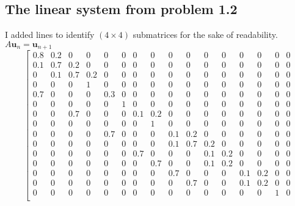 \documentclass[letterpaper, 10pt]{article}
\begin{document}
\subsection{The linear system from problem 1.2}
I added lines to identify $(4 \times 4)$ submatrices for the sake of readability. $A \mathbf{u}_n = \mathbf{u}_{n+1}$
\[
\left[
\begin{array}{cccc|cccc|cccc|cccc}
0.8 & 0.2  & 0   & 0   & 0   & 0   & 0   & 0   & 0   & 0   & 0   & 0   & 0   & 0   & 0   & 0   \\ %
0.1 & 0.7  & 0.2 & 0   & 0   & 0   & 0   & 0   & 0   & 0   & 0   & 0   & 0   & 0   & 0   & 0   \\ %
0   & 0.1  & 0.7 & 0.2 & 0   & 0   & 0   & 0   & 0   & 0   & 0   & 0   & 0   & 0   & 0   & 0   \\ %
0   & 0    & 0   & 1   & 0   & 0   & 0   & 0   & 0   & 0   & 0   & 0   & 0   & 0   & 0   & 0   \\ %
\hline
0.7 & 0    & 0   & 0   & 0.3 & 0   & 0   & 0   & 0   & 0   & 0   & 0   & 0   & 0   & 0   & 0   \\ %
0   & 0    & 0   & 0   & 0   & 1   & 0   & 0   & 0   & 0   & 0   & 0   & 0   & 0   & 0   & 0   \\ %
0   & 0    & 0.7 & 0   & 0   & 0   & 0.1 & 0.2 & 0   & 0   & 0   & 0   & 0   & 0   & 0   & 0   \\ %
0   & 0    & 0   & 0   & 0   & 0   & 0   & 1   & 0   & 0   & 0   & 0   & 0   & 0   & 0   & 0   \\ %
\hline
0   & 0    & 0   & 0   & 0.7 & 0   & 0   & 0   & 0.1 & 0.2 & 0   & 0   & 0   & 0   & 0   & 0   \\ %
0   & 0    & 0   & 0   & 0   & 0   & 0   & 0   & 0.1 & 0.7 & 0.2 & 0   & 0   & 0   & 0   & 0   \\ %
0   & 0    & 0   & 0   & 0   & 0   & 0.7 & 0   & 0   & 0   & 0.1 & 0.2 & 0   & 0   & 0   & 0   \\ %
0   & 0    & 0   & 0   & 0   & 0   & 0   & 0.7 & 0   & 0   & 0.1 & 0.2 & 0   & 0   & 0   & 0   \\ %
\hline
0   & 0    & 0   & 0   & 0   & 0   & 0   & 0   & 0.7 & 0   & 0   & 0   & 0.1 & 0.2 & 0   & 0   \\ %
0   & 0    & 0   & 0   & 0   & 0   & 0   & 0   & 0   & 0.7 & 0   & 0   & 0.1 & 0.2 & 0   & 0   \\ %
0   & 0    & 0   & 0   & 0   & 0   & 0   & 0   & 0   & 0   & 0   & 0   & 0   & 0   & 1   & 0   \\ %

\end{array}\]
\end{document}

